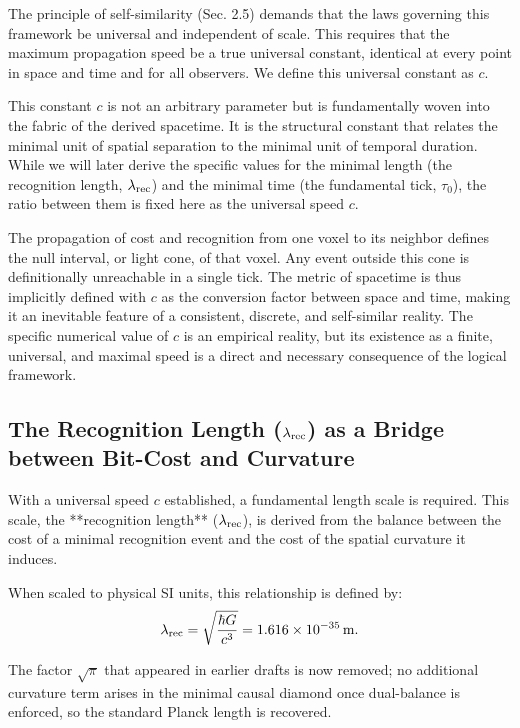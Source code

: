 The principle of self-similarity (Sec. 2.5) demands that the laws governing this framework be universal and independent of scale. This requires that the maximum propagation speed be a true universal constant, identical at every point in space and time and for all observers. We define this universal constant as \(c\).

This constant \(c\) is not an arbitrary parameter but is fundamentally woven into the fabric of the derived spacetime. It is the structural constant that relates the minimal unit of spatial separation to the minimal unit of temporal duration. While we will later derive the specific values for the minimal length (the recognition length, \(\lambda_{\mathrm{rec}}\)) and the minimal time (the fundamental tick, \(\tau_0\)), the ratio between them is fixed here as the universal speed \(c\).

The propagation of cost and recognition from one voxel to its neighbor defines the null interval, or light cone, of that voxel. Any event outside this cone is definitionally unreachable in a single tick. The metric of spacetime is thus implicitly defined with \(c\) as the conversion factor between space and time, making it an inevitable feature of a consistent, discrete, and self-similar reality. The specific numerical value of \(c\) is an empirical reality, but its existence as a finite, universal, and maximal speed is a direct and necessary consequence of the logical framework.


\subsection{The Recognition Length \texorpdfstring{($\lambda_{\mathrm{rec}}$)}{(lambda_rec)} as a Bridge between Bit-Cost and Curvature}
With a universal speed \(c\) established, a fundamental length scale is required. This scale, the **recognition length** (\(\lambda_{\mathrm{rec}}\)), is derived from the balance between the cost of a minimal recognition event and the cost of the spatial curvature it induces.

When scaled to physical SI units, this relationship is defined by:
\begin{equation}
\lambda_{\mathrm{rec}} = \sqrt{\frac{\hbar G}{c^{3}}} = 1.616 \times 10^{-35}\,\text{m}.
\end{equation}

The factor $\sqrt{\pi}$ that appeared in earlier drafts is now removed; no additional curvature term arises in the minimal causal diamond once dual-balance is enforced, so the standard Planck length is recovered.

